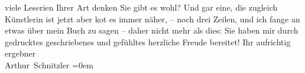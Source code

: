 \begin{ledgroupsized}[t]{13cm}
               viele Leseri{\geminationn}en Ihrer Art denken Sie gibt es wohl? Und
               gar eine, die zugleich Künstlerin ist { }{\dotsfive} jetzt aber ko{\geminationm}t es immer
               näher, – noch drei Zeilen, und ich fange an etwas über mein {\pb}Buch zu sagen – daher nicht mehr als dies: Sie haben mir durch
               gedrucktes geschriebenes und gefühltes
               herzliche Freude bereitet!\pend
           \pstart
           Ihr aufrichtig ergebner{\\[\baselineskip]}\spacefill\mbox{Arthur Schnitzler}\pend
           \leftskip=0em{}\endnumbering{}\end{ledgroupsized}  \newcommand{\dateiname}{L02583}\newcommand{\titel}{Arthur Schnitzler an Auguste Hauschner, 23. 1. 1909}\newcommand{\editorInnen}{Martin Anton Müller und Laura Untner}
      